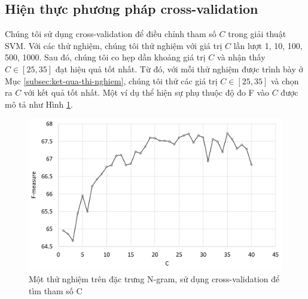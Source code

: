 \subsection{Hiện thực phương pháp cross-validation}
Chúng tôi sử dụng cross-validation để điều chỉnh tham số $C$ trong giải thuật SVM. Với các thử nghiệm, chúng tôi thử nghiệm với giá trị $C$ lần lượt 1, 10, 100, 500, 1000. Sau đó, chúng tôi co hẹp dần khoảng giá trị $C$ và nhận thấy $C \in [25, 35]$ đạt hiệu quả tốt nhất. Từ đó, với mỗi thử nghiệm được trình bày ở Mục \ref{subsec:ket-qua-thi-nghiem}, chúng tôi thử các giá trị $C \in [25, 35]$ và chọn ra $C$ với kết quả tốt nhất. Một ví dụ thể hiện sự phụ thuộc độ đo F vào $C$ được mô tả như Hình \ref{fig:hien-thuc-cross}.
\begin{figure}[h]
\centering
\includegraphics[scale=0.34]{../hinh/hien_thuc_cross.png}
\caption{Một thử nghiệm trên đặc trưng N-gram, sử dụng cross-validation để tìm tham số C}
\label{fig:hien-thuc-cross}
\end{figure}